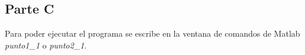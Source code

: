 \documentclass[onecolumn]{IEEEtran}
\begin{document}
\subsection{Parte C}
\noindent
Para poder ejecutar el programa se escribe en la ventana de comandos de Matlab \textit{punto1\_1} o \textit{punto2\_1}.
\begin{figure}[]
    \begin{minipage}[t]{1cm}
    \centering
    \end{minipage}
    \hfill\begin{minipage}[t]{9cm}
    \centering
    \end{minipage}
            \label{fig2}
\end{figure}
\end{document}
